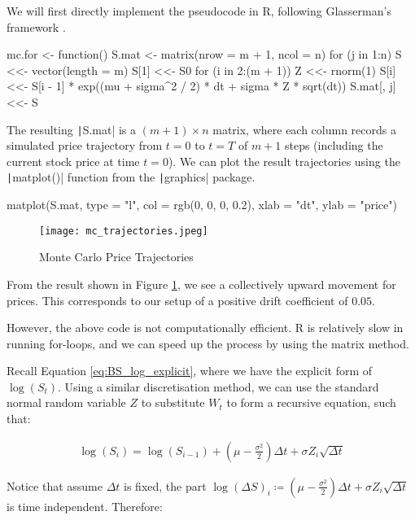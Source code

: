 We will first directly implement the pseudocode in R, following Glasserman's framework \cite{Glasserman2003}.

\begin{Rminted}
mc.for <- function() {
    S.mat <- matrix(nrow = m + 1, ncol = n)
    for (j in 1:n) {
        S <<- vector(length = m)
        S[1] <<- S0
        for (i in 2:(m + 1)) {
            Z <<- rnorm(1)
            S[i] <<- S[i - 1] * exp((mu + sigma^2 / 2) * dt + sigma * Z * sqrt(dt))
        }
        S.mat[, j] <<- S
    }
}
\end{Rminted}

The resulting \texttt|S.mat| is a $(m + 1) \times n$ matrix, where each column records a simulated price trajectory from $t=0$ to $t=T$ of $m+1$ steps (including the current stock price at time $t=0$). We can plot the result trajectories using the \texttt|matplot()| function from the \texttt|graphics| package.

\begin{Rminted}
matplot(S.mat, type = "l", col = rgb(0, 0, 0, 0.2),
        xlab = "dt", ylab = "price")
\end{Rminted}

\begin{figure}[H]
	\centering
	\texttt{[image: mc\_trajectories.jpeg]}
	\caption{Monte Carlo Price Trajectories} \label{img:mc_trajectories}
\end{figure}

From the result shown in Figure \ref{img:mc_trajectories}, we see a collectively upward movement for prices. This corresponds to our setup of a positive drift coefficient of $0.05$.

However, the above code is not computationally efficient. R is relatively slow in running for-loops, and we can speed up the process by using the matrix method.

Recall Equation \ref{eq:BS_log_explicit}, where we have the explicit form of $\log(S_t)$. Using a similar discretisation method, we can use the standard normal random variable $Z$ to substitute $W_t$ to form a recursive equation, such that:

\begin{align*}
\log(S_i) = \log(S_{i-1}) + (\mu - \frac{\sigma^2}{2})\Delta t + \sigma Z_i \sqrt{\Delta t}
\end{align*}

Notice that assume $\Delta t$ is fixed, the part $\log(\Delta S)_i\coloneqq(\mu - \frac{\sigma^2}{2})\Delta t + \sigma Z_i \sqrt{\Delta t}$ is time independent. Therefore:


